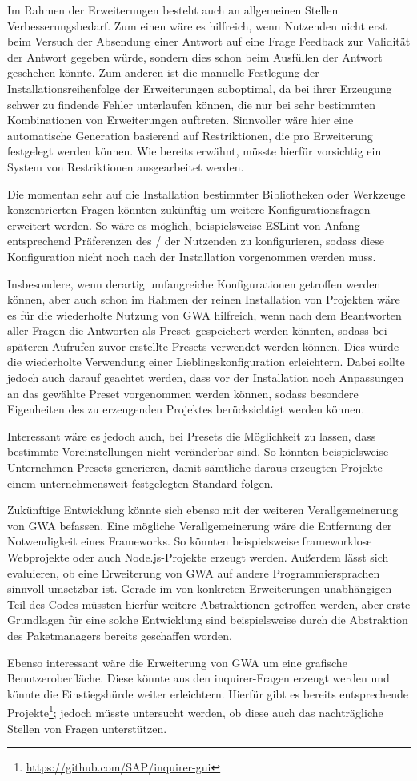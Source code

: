 Im Rahmen der Erweiterungen besteht auch an allgemeinen Stellen Verbesserungsbedarf. Zum einen wäre es hilfreich, wenn Nutzenden nicht erst beim Versuch der Absendung einer Antwort auf eine Frage Feedback zur Validität der Antwort gegeben würde, sondern dies schon beim Ausfüllen der Antwort geschehen könnte. Zum anderen ist die manuelle Festlegung der Installationsreihenfolge der Erweiterungen suboptimal, da bei ihrer Erzeugung schwer zu findende Fehler unterlaufen können, die nur bei sehr bestimmten Kombinationen von Erweiterungen auftreten. Sinnvoller wäre hier eine automatische Generation basierend auf Restriktionen, die pro Erweiterung festgelegt werden können. Wie bereits erwähnt, müsste hierfür vorsichtig ein System von Restriktionen ausgearbeitet werden.

Die momentan sehr auf die Installation bestimmter Bibliotheken oder Werkzeuge konzentrierten Fragen könnten zukünftig um weitere Konfigurationsfragen erweitert werden. So wäre es möglich, beispielsweise ESLint von Anfang entsprechend Präferenzen des / der Nutzenden zu konfigurieren, sodass diese Konfiguration nicht noch nach der Installation vorgenommen werden muss.

Insbesondere, wenn derartig umfangreiche Konfigurationen getroffen werden können, aber auch schon im Rahmen der reinen Installation von Projekten wäre es für die wiederholte Nutzung von \gls{GWA} hilfreich, wenn nach dem Beantworten aller Fragen die Antworten als \glqq Preset\grqq\ gespeichert werden könnten, sodass bei späteren Aufrufen zuvor erstellte Presets verwendet werden können. Dies würde die wiederholte Verwendung einer Lieblingskonfiguration erleichtern. Dabei sollte jedoch auch darauf geachtet werden, dass vor der Installation noch Anpassungen an das gewählte Preset vorgenommen werden können, sodass besondere Eigenheiten des zu erzeugenden Projektes berücksichtigt werden können.

Interessant wäre es jedoch auch, bei Presets die Möglichkeit zu lassen, dass bestimmte Voreinstellungen nicht veränderbar sind. So könnten beispielsweise Unternehmen Presets generieren, damit sämtliche daraus erzeugten Projekte einem unternehmensweit festgelegten Standard folgen.

Zukünftige Entwicklung könnte sich ebenso mit der weiteren Verallgemeinerung von \gls{GWA} befassen. Eine mögliche Verallgemeinerung wäre die Entfernung der Notwendigkeit eines Frameworks. So könnten beispielsweise frameworklose Webprojekte oder auch Node.js-Projekte erzeugt werden. Außerdem lässt sich evaluieren, ob eine Erweiterung von \gls{GWA} auf andere Programmiersprachen sinnvoll umsetzbar ist. Gerade im von konkreten Erweiterungen unabhängigen Teil des Codes müssten hierfür weitere Abstraktionen getroffen werden, aber erste Grundlagen für eine solche Entwicklung sind beispielsweise durch die Abstraktion des Paketmanagers bereits geschaffen worden.

Ebenso interessant wäre die Erweiterung von \gls{GWA} um eine grafische Benutzeroberfläche. Diese könnte aus den inquirer-Fragen erzeugt werden und könnte die Einstiegshürde weiter erleichtern. Hierfür gibt es bereits entsprechende Projekte\footnote{\url{https://github.com/SAP/inquirer-gui}}; jedoch müsste untersucht werden, ob diese auch das nachträgliche Stellen von Fragen unterstützen.